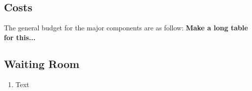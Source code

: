 \documentclass [11pt]{article}
\begin{document}
\subsection{Costs}	
The general budget for the major components are as follow:
\textbf{Make a long table for this...}
%		


\subsection{Waiting Room}
	\begin{enumerate}[label=\textbf{(\roman*)}]
		\item Text
	    \end{enumerate} 

\end{document}
